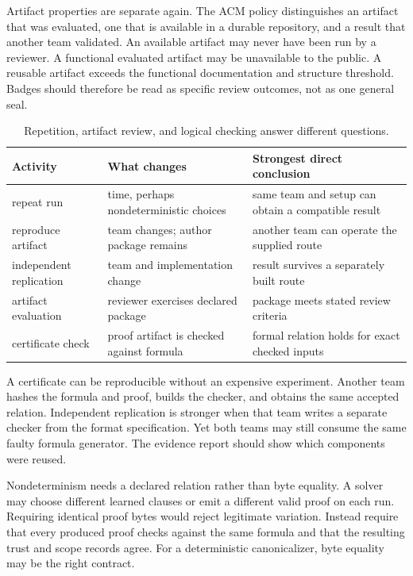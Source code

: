 Artifact properties are separate again. The ACM policy distinguishes an
artifact that was evaluated, one that is available in a durable repository,
and a result that another team validated. An available artifact may never have
been run by a reviewer. A functional evaluated artifact may be unavailable to
the public. A reusable artifact exceeds the functional documentation and
structure threshold. Badges should therefore be read as specific review
outcomes, not as one general seal.

\begin{table}[htbp]
\centering
\caption{Repetition, artifact review, and logical checking answer different
questions.}
\begin{tabular}{@{}p{}p{}p{}@{}}
\toprule
Activity & What changes & Strongest direct conclusion \\
\midrule
repeat run & time, perhaps nondeterministic choices & same team and setup can obtain a compatible result \\
reproduce artifact & team changes; author package remains & another team can operate the supplied route \\
independent replication & team and implementation change & result survives a separately built route \\
artifact evaluation & reviewer exercises declared package & package meets stated review criteria \\
certificate check & proof artifact is checked against formula & formal relation holds for exact checked inputs \\
\bottomrule
\end{tabular}
\label{tab:reproduction-relations}
\end{table}

A certificate can be reproducible without an expensive experiment. Another
team hashes the formula and proof, builds the checker, and obtains the same
accepted relation. Independent replication is stronger when that team writes
a separate checker from the format specification. Yet both teams may still
consume the same faulty formula generator. The evidence report should show
which components were reused.

Nondeterminism needs a declared relation rather than byte equality. A solver
may choose different learned clauses or emit a different valid proof on each
run. Requiring identical proof bytes would reject legitimate variation.
Instead require that every produced proof checks against the same formula and
that the resulting trust and scope records agree. For a deterministic
canonicalizer, byte equality may be the right contract.

